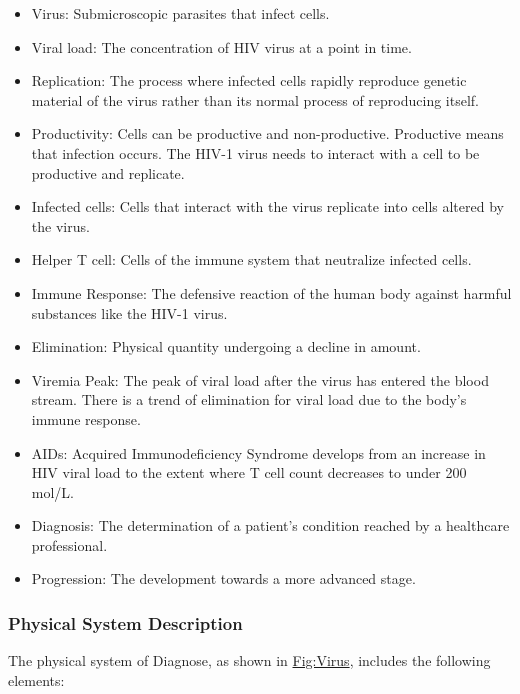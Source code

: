 \documentclass[12pt]{article}
\begin{document}
\begin{itemize}
\item{Virus: Submicroscopic parasites that infect cells.}
\item{Viral load: The concentration of HIV virus at a point in time.}
\item{Replication: The process where infected cells rapidly reproduce genetic material of the virus rather than its normal process of reproducing itself.}
\item{Productivity:  Cells can be productive and non-productive. Productive means that infection occurs. The HIV-1 virus needs to interact with a cell to be productive and replicate.}
\item{Infected cells: Cells that interact with the virus replicate into cells altered by the virus.}
\item{Helper T cell: Cells of the immune system that neutralize infected cells.}
\item{Immune Response: The defensive reaction of the human body against harmful substances like the HIV-1 virus.}
\item{Elimination: Physical quantity undergoing a decline in amount.}
\item{Viremia Peak: The peak of viral load after the virus has entered the blood stream. There is a trend of elimination for viral load due to the body's immune response.}
\item{AIDs: Acquired Immunodeficiency Syndrome develops from an increase in HIV viral load to the extent where T cell count decreases to under 200 mol/L.}
\item{Diagnosis: The determination of a patient's condition reached by a healthcare professional.}
\item{Progression: The development towards a more advanced stage.}
\end{itemize}
\subsubsection{Physical System Description}
\label{Sec:PhysSyst}
The physical system of Diagnose, as shown in \hyperref[Figure:Virus]{Fig:Virus}, includes the following elements:
\end{document}
